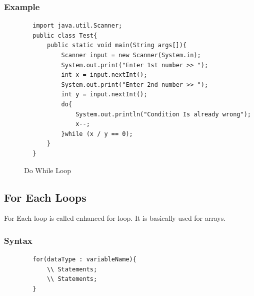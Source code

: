 \documentclass[openany]{book}  %
\begin{document}
\subsubsection{Example}
\begin{center}
    \footnotesize
    \begin{verbatim}
        import java.util.Scanner;
        public class Test{
            public static void main(String args[]){
                Scanner input = new Scanner(System.in);
                System.out.print("Enter 1st number >> ");
                int x = input.nextInt();
                System.out.print("Enter 2nd number >> ");
                int y = input.nextInt();
                do{
                    System.out.println("Condition Is already wrong");
                    x--;
                }while (x / y == 0);
            }
        }
    \end{verbatim}
\end{center}
% 
% 
\begin{figure}[htbp]
    \begin{center}
        \caption{Do While Loop\cite{Ref3}}
    \end{center}
\end{figure}
% 
% 

\newpage

\subsection{For Each Loops}
For Each loop is called enhanced for loop. It is basically used
for arrays. 
% 
% 
\subsubsection{Syntax}
\begin{center}
    \begin{verbatim}
        for(dataType : variableName){
            \\ Statements;
            \\ Statements;
        }
    \end{verbatim}
\end{center}
% 
% 
\end{document}
